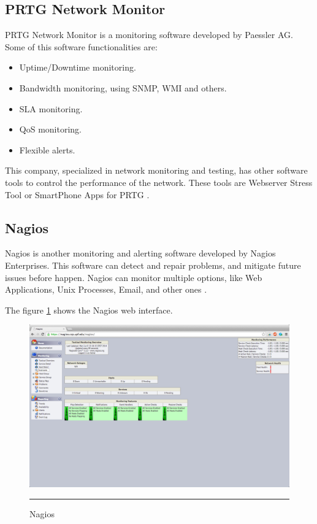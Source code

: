 \documentclass[12pt, a4paper,twoside]{tesi_upf}
\begin{document}
\subsection{PRTG Network Monitor}
PRTG Network Monitor is a monitoring software developed by Paessler AG. 
Some of this software functionalities are:
\begin{itemize}
\item Uptime/Downtime monitoring.
\item Bandwidth monitoring, using SNMP, WMI and others.
\item SLA monitoring.
\item QoS monitoring.
\item Flexible alerts.
\end{itemize}

This company, specialized in network monitoring and testing, has other software tools to control the performance of the network. These tools are Webserver Stress Tool or SmartPhone Apps for PRTG \cite{prtg}.

\subsection{Nagios}
Nagios is another monitoring and alerting software developed by Nagios Enterprises. This software can detect and repair problems, and mitigate future issues before happen. Nagios can monitor multiple options, like Web Applications, Unix Processes, Email, and other ones \cite{nagios}.

The figure \ref{fig:nagios} shows the Nagios web interface.

      \begin{figure}[H]
          \centering
              \includegraphics[scale=0.27]{./figures/Nagios.png}
              \rule{32em}{0.5pt}
          \caption[Nagios]{Nagios}
          \label{fig:nagios}
        \end{figure}
\end{document}
